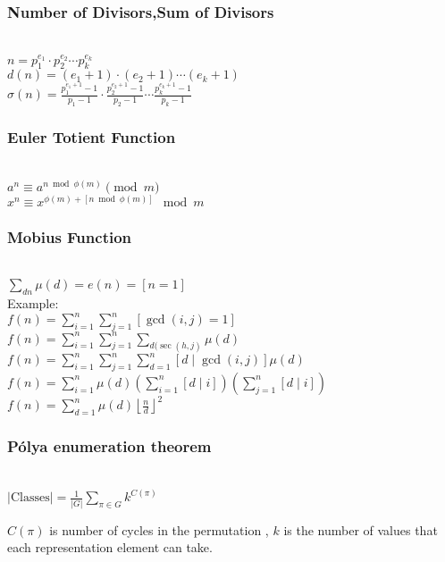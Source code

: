 \subsubsection{Number of Divisors,Sum of Divisors}\\

$n = p_1^{e_1} \cdot p_2^{e_2} \cdots p_k^{e_k}$\\
$d(n) = (e_1 + 1) \cdot (e_2 + 1) \cdots (e_k + 1)$\\

$\sigma(n) = \frac{p_1^{e_1 + 1} - 1}{p_1 - 1} \cdot \frac{p_2^{e_2 + 1} - 1}{p_2 - 1} \cdots \frac{p_k^{e_k + 1} - 1}{p_k - 1}$\\

\subsubsection{Euler Totient Function}\\

$a^n \equiv a^{n \bmod \phi(m)} \pmod m$\\
$x^{n}\equiv x^{\phi(m)+[n \bmod \phi(m)]} \mod m$\\


\subsubsection{Mobius Function}\\

$\sum_{d n} \mu(d)=e(n)=[n=1]$\\

Example:\\

$f(n)=\sum_{i=1}^n \sum_{j=1}^n[\operatorname{gcd}(i, j)=1]$\\
$f(n)=\sum_{i=1}^n \sum_{j=1}^n \sum_{d(\sec (h, j)} \mu(d)$\\
$f(n)=\sum_{i=1}^n \sum_{j=1}^n \sum_{d=1}^n[d \mid \operatorname{gcd}(i, j)] \mu(d)$\\
$f(n)=\sum_{i=1}^n \mu(d)\left(\sum_{i=1}^n[d \mid i]\right)\left(\sum_{j=1}^n[d \mid i]\right)$\\
$f(n)=\sum_{d=1}^n \mu(d)\left\lfloor\frac{n}{d}\right\rfloor^2$\\

\subsubsection{Pólya enumeration theorem}\\

$|\text{Classes}| = \frac{1}{|G|} \sum_{\pi \in G} k^{C(\pi)}$

$C(\pi)$ is number of cycles in the permutation \pi, $k$ is the number of values that each representation element can take.


